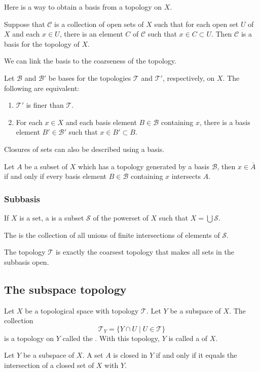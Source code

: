 Here is a way to obtain a basis from a topology on $X$.
\begin{lemma}
Suppose that $\mathcal{C}$ is a collection of open sets of $X$ such that for each open set $U$ of $X$ and each $x \in U$, there is an element $C$ of $\mathcal{C}$ such that $x\in C \subset U$. Then $\mathcal{C}$ is a basis for the topology of $X$.
\end{lemma}

We can link the basis to the coarseness of the topology.
\begin{lemma} \label{basisCoarseness}
Let $\mathcal{B}$ and $\mathcal{B}'$ be bases for the topologies $\mathcal{T}$ and $\mathcal{T}'$, respectively, on $X$. The following are equivalent:
\begin{enumerate}
\item $\mathcal{T}'$ is finer than $\mathcal{T}$.
\item For each $x\in X$ and each basis element $B\in\mathcal{B}$ containing $x$, there is a basis element $B'\in\mathcal{B'}$ such that $x\in B'\subset B$.
\end{enumerate}
\end{lemma}

Closures of sets can also be described using a basis.
\begin{lemma}
Let $A$ be a subset of $X$ which has a topology generated by a basis $\mathcal{B}$, then $x\in\bar{A}$ if and only if every basis element $B\in\mathcal{B}$ containing $x$ intersects $A$.
\end{lemma}

\subsubsection{Subbasis}
\begin{definition}
If $X$ is a set, a  is a subset $\mathcal{S}$ of the powerset of $X$ such that $X = \bigcup \mathcal{S}$.

The  is the collection of all unions of finite intersections of elements of $\mathcal{S}$. 
\end{definition}
The topology $\mathcal{T}$ is exactly the coarsest topology that makes all sets in the subbasis open.

\subsection{The subspace topology}
\begin{definition}
Let $X$ be a topological space with topology $\mathcal{T}$. Let $Y$ be a subspace of $X$. The collection
\[ \mathcal{T}_Y = \{ Y\cap U\;|\; U\in \mathcal{T} \} \]
is a topology on $Y$ called the . With this topology, $Y$ is called a  of $X$.
\end{definition}
\begin{lemma}
Let $Y$ be a subspace of $X$. A set $A$ is closed in $Y$ \textup{if and only if} it equals the intersection of a closed set of $X$ with $Y$.
\end{lemma}

